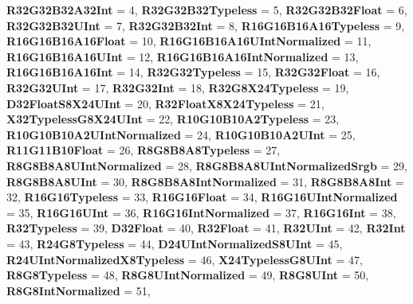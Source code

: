 \begin{DoxyCompactItemize}
{\bfseries R32\+G32\+B32\+A32\+Int} = 4, 
{\bfseries R32\+G32\+B32\+Typeless} = 5, 
{\bfseries R32\+G32\+B32\+Float} = 6, 
{\bfseries R32\+G32\+B32\+U\+Int} = 7, 
\newline
{\bfseries R32\+G32\+B32\+Int} = 8, 
{\bfseries R16\+G16\+B16\+A16\+Typeless} = 9, 
{\bfseries R16\+G16\+B16\+A16\+Float} = 10, 
{\bfseries R16\+G16\+B16\+A16\+U\+Int\+Normalized} = 11, 
\newline
{\bfseries R16\+G16\+B16\+A16\+U\+Int} = 12, 
{\bfseries R16\+G16\+B16\+A16\+Int\+Normalized} = 13, 
{\bfseries R16\+G16\+B16\+A16\+Int} = 14, 
{\bfseries R32\+G32\+Typeless} = 15, 
\newline
{\bfseries R32\+G32\+Float} = 16, 
{\bfseries R32\+G32\+U\+Int} = 17, 
{\bfseries R32\+G32\+Int} = 18, 
{\bfseries R32\+G8\+X24\+Typeless} = 19, 
\newline
{\bfseries D32\+Float\+S8\+X24\+U\+Int} = 20, 
{\bfseries R32\+Float\+X8\+X24\+Typeless} = 21, 
{\bfseries X32\+Typeless\+G8\+X24\+U\+Int} = 22, 
{\bfseries R10\+G10\+B10\+A2\+Typeless} = 23, 
\newline
{\bfseries R10\+G10\+B10\+A2\+U\+Int\+Normalized} = 24, 
{\bfseries R10\+G10\+B10\+A2\+U\+Int} = 25, 
{\bfseries R11\+G11\+B10\+Float} = 26, 
{\bfseries R8\+G8\+B8\+A8\+Typeless} = 27, 
\newline
{\bfseries R8\+G8\+B8\+A8\+U\+Int\+Normalized} = 28, 
{\bfseries R8\+G8\+B8\+A8\+U\+Int\+Normalized\+Srgb} = 29, 
{\bfseries R8\+G8\+B8\+A8\+U\+Int} = 30, 
{\bfseries R8\+G8\+B8\+A8\+Int\+Normalized} = 31, 
\newline
{\bfseries R8\+G8\+B8\+A8\+Int} = 32, 
{\bfseries R16\+G16\+Typeless} = 33, 
{\bfseries R16\+G16\+Float} = 34, 
{\bfseries R16\+G16\+U\+Int\+Normalized} = 35, 
\newline
{\bfseries R16\+G16\+U\+Int} = 36, 
{\bfseries R16\+G16\+Int\+Normalized} = 37, 
{\bfseries R16\+G16\+Int} = 38, 
{\bfseries R32\+Typeless} = 39, 
\newline
{\bfseries D32\+Float} = 40, 
{\bfseries R32\+Float} = 41, 
{\bfseries R32\+U\+Int} = 42, 
{\bfseries R32\+Int} = 43, 
\newline
{\bfseries R24\+G8\+Typeless} = 44, 
{\bfseries D24\+U\+Int\+Normalized\+S8\+U\+Int} = 45, 
{\bfseries R24\+U\+Int\+Normalized\+X8\+Typeless} = 46, 
{\bfseries X24\+Typeless\+G8\+U\+Int} = 47, 
\newline
{\bfseries R8\+G8\+Typeless} = 48, 
{\bfseries R8\+G8\+U\+Int\+Normalized} = 49, 
{\bfseries R8\+G8\+U\+Int} = 50, 
{\bfseries R8\+G8\+Int\+Normalized} = 51, 
\newline

\end{DoxyCompactItemize}
